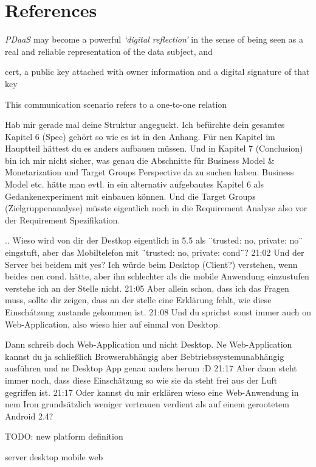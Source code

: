 \documentclass[12pt,english,a4paper,titlepage,cleardoublepage=empty,dottedtoc]{report}
\begin{document}
\chapter*{References}\label{references}

\emph{PDaaS} may become a powerful \emph{`digital reflection'} in the
sense of being seen as a real and reliable representation of the data
subject, and

cert, a public key attached with owner information and a digital
signature of that key

This communication scenario refers to a one-to-one relation

Hab mir gerade mal deine Struktur angeguckt. Ich befürchte dein gesamtes
Kapitel 6 (Spec) gehört so wie es ist in den Anhang. Für nen Kapitel im
Hauptteil hättest du es anders aufbauen müssen. Und in Kapitel 7
(Conclusion) bin ich mir nicht sicher, was genau die Abschnitte für
Business Model \& Monetarization und Target Groups Perspective da zu
suchen haben. Business Model etc. hätte man evtl. in ein alternativ
aufgebautes Kapitel 6 als Gedankenexperiment mit einbauen können. Und
die Target Groups (Zielgruppenanalyse) müsste eigentlich noch in die
Requirement Analyse also vor der Requirement Spezifikation.

.. Wieso wird von dir der Destkop eigentlich in 5.5 als ¨trusted: no,
private: no¨ eingstuft, aber das Mobiltelefon mit ¨trusted: no, private:
cond¨? 21:02 Und der Server bei beidem mit yes? Ich würde beim Desktop
(Client?) verstehen, wenn beides nen cond. hätte, aber ihn schlechter
als die mobile Anwendung einzustufen verstehe ich an der Stelle nicht.
21:05 Aber allein schon, dass ich das Fragen muss, sollte dir zeigen,
dass an der stelle eine Erklärung fehlt, wie diese Einschátzung zustande
gekommen ist. 21:08 Und du sprichst sonst immer auch on Web-Application,
also wieso hier auf einmal von Desktop.

Dann schreib doch Web-Application und nicht Desktop. Ne Web-Application
kannst du ja schließlich Browserabhängig aber Bebtriebssystemunabhängig
ausführen und ne Desktop App genau anders herum :D 21:17 Aber dann steht
immer noch, dass diese Einschätzung so wie sie da steht frei aus der
Luft gegriffen ist. 21:17 Oder kannst du mir erklären wieso eine
Web-Anwendung in nem Iron grundsätzlich weniger vertrauen verdient als
auf einem gerootetem Android 2.4?

TODO: new platform definition

server desktop mobile web
\end{document}
